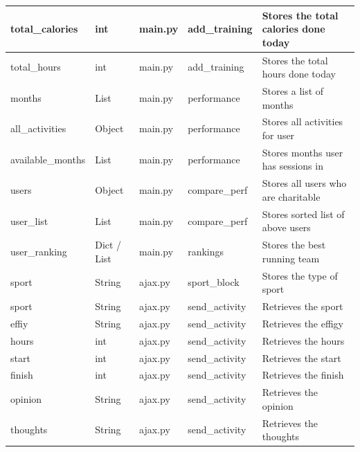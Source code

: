 \documentclass{article}[12pt,a4paper]
\begin{document}
\begin{table}[h]
\begin{tabular}{lllll}
total\_calories   & int           & main.py             & add\_training           & Stores the total calories done today    \\ \hline
total\_hours      & int           & main.py             & add\_training           & Stores the total hours done today       \\ \hline
months            & List          & main.py             & performance             & Stores a list of months                 \\ \hline
all\_activities   & Object        & main.py             & performance             & Stores all activities for user          \\ \hline
available\_months & List          & main.py             & performance             & Stores months user has sessions in      \\ \hline
users             & Object        & main.py             & compare\_perf           & Stores all users who are charitable     \\ \hline
user\_list        & List          & main.py             & compare\_perf           & Stores sorted list of above users       \\ \hline
user\_ranking     & Dict / List   & main.py             & rankings                & Stores the best running team            \\ \hline
sport             & String        & ajax.py             & sport\_block              & Stores the type of sport                \\
sport             & String        & ajax.py             & send\_activity            & Retrieves the sport                     \\
effiy             & String        & ajax.py             & send\_activity            & Retrieves the effigy                    \\
hours             & int           & ajax.py             & send\_activity            & Retrieves the hours                     \\
start             & int           & ajax.py             & send\_activity            & Retrieves the start                     \\
finish            & int           & ajax.py             & send\_activity            & Retrieves the finish                    \\
opinion           & String        & ajax.py             & send\_activity            & Retrieves the opinion                   \\
thoughts          & String        & ajax.py             & send\_activity            & Retrieves the thoughts                  \\

\end{tabular}
\end{table}
\end{document}
